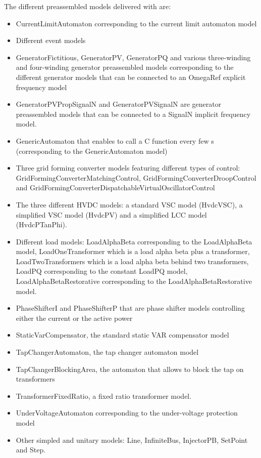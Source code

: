 \documentclass[a4paper, 12pt]{report}
\begin{document}
The different preassembled models delivered with \Dynawo are:
\begin{itemize}
\item CurrentLimitAutomaton corresponding to the current limit automaton model
\item Different event models
\item GeneratorFictitious, GeneratorPV, GeneratorPQ and various three-winding and four-winding generator preassembled models corresponding to the different generator models that can be connected to an OmegaRef explicit frequency model
\item GeneratorPVPropSignalN and GeneratorPVSignalN are generator preassembled models that can be connected to a SignalN implicit frequency model.
\item GenericAutomaton that enables to call a C function every few s (corresponding to the GenericAutomaton model)
\item Three grid forming converter models featuring different types of control: GridFormingConverterMatchingControl, GridFormingConverterDroopControl and GridFormingConverterDispatchableVirtualOscillatorControl
\item The three different HVDC models: a standard VSC model (HvdcVSC), a simplified VSC model (HvdcPV) and a simplified LCC model (HvdcPTanPhi).
\item Different load models: LoadAlphaBeta corresponding to the LoadAlphaBeta model, LoadOneTransformer which is a load alpha beta plus a transformer, LoadTwoTransformers which is a load alpha beta behind two transformers, LoadPQ corresponding to the constant LoadPQ model, LoadAlphaBetaRestorative corresponding to the LoadAlphaBetaRestorative model.
\item PhaseShifterI and PhaseShifterP that are phase shifter models controlling either the current or the active power
\item StaticVarCompensator, the standard static VAR compensator model
\item TapChangerAutomaton, the tap changer automaton model
\item TapChangerBlockingArea, the automaton that allows to block the tap on transformers
\item TransformerFixedRatio, a fixed ratio transformer model.
\item UnderVoltageAutomaton corresponding to the under-voltage protection model
\item Other simpled and unitary models: Line, InfiniteBus, InjectorPB, SetPoint and Step.
\end{itemize}
\end{document}
